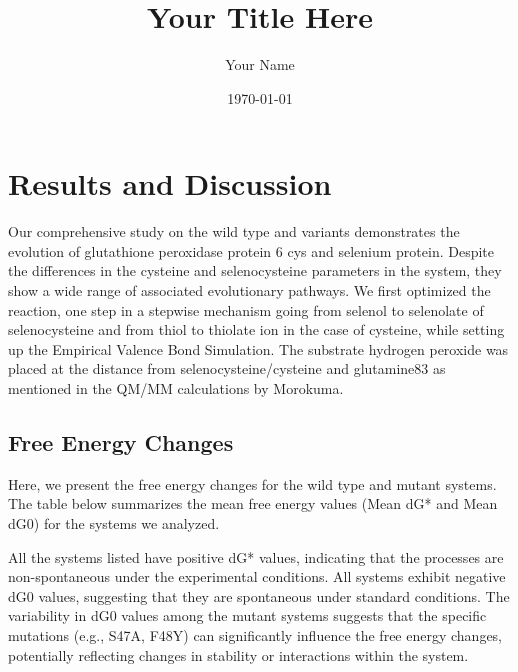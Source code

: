 \documentclass{article}
\begin{document}
\title{Your Title Here}
\author{Your Name}
\date{\today}
\maketitle

\section{Results and Discussion}

Our comprehensive study on the wild type and variants demonstrates the evolution of glutathione peroxidase protein 6 cys and selenium protein. 
Despite the differences in the cysteine and selenocysteine parameters in the system, they show a wide range of associated evolutionary pathways.
We first optimized the reaction, one step in a stepwise mechanism going from selenol to selenolate of selenocysteine and from thiol to thiolate ion in the case of cysteine, while setting up the Empirical Valence Bond Simulation.
The substrate hydrogen peroxide was placed at the distance from selenocysteine/cysteine and glutamine83 as mentioned in the QM/MM calculations by Morokuma.

\subsection{Free Energy Changes}

Here, we present the free energy changes for the wild type and mutant systems. The table below summarizes the mean free energy values (Mean dG* and Mean dG0) for the systems we analyzed.



All the systems listed have positive dG* values, indicating that the processes are non-spontaneous under the experimental conditions.
All systems exhibit negative dG0 values, suggesting that they are spontaneous under standard conditions.
The variability in dG0 values among the mutant systems suggests that the specific mutations (e.g., S47A, F48Y) can significantly influence the free energy changes, potentially reflecting changes in stability or interactions within the system.
\end{document}

